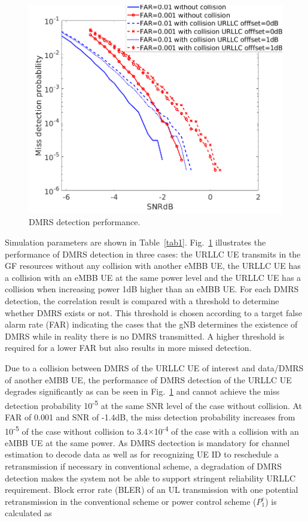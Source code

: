 \documentclass[conference]{IEEEtran}
\begin{document}
\begin{figure}[htbp]
\centerline{\includegraphics[scale=0.31]{fig5.png}}
\caption{DMRS detection performance.}
\label{fig5}
\vspace{-3mm}
\end{figure}

Simulation parameters are shown in Table~\ref{tab1}. Fig.~\ref{fig5} illustrates the performance of DMRS detection in three cases: the URLLC UE transmits in the GF resources without any collision with another eMBB UE, the URLLC UE has a collision with an eMBB UE at the same power level and the URLLC UE has a collision when increasing power 1dB higher than an eMBB UE. For each DMRS detection, the correlation result is compared with a threshold to determine whether DMRS exists or not. This threshold is chosen according to a target false alarm rate (FAR) indicating the cases that the gNB determines the existence of DMRS while in reality there is no DMRS transmitted. A higher threshold is required for a lower FAR but also results in more missed detection.

Due to a collision between DMRS of the URLLC UE of interest and data/DMRS of another eMBB UE, the performance of DMRS detection of the URLLC UE degrades significantly as can be seen in Fig.~\ref{fig5} and cannot achieve the miss detection probability 10\textsuperscript{-5} at the same SNR level of the case without collision. At FAR of 0.001 and SNR of -1.4dB, the miss detection probability increases from 10\textsuperscript{-5} of the case without collision to 3.4$\times$10\textsuperscript{-4} of the case with a collision with an eMBB UE at the same power. As DMRS dectection is mandatory for channel estimation to decode data as well as for recognizing UE ID to reschedule a retransmission if necessary in conventional scheme, a degradation of DMRS detection makes the system not be able to support stringent reliability URLLC requirement. Block error rate (BLER) of an UL transmission with one potential retransmission in the conventional scheme or power control scheme ($ P^{e}_{1}$) is calculated as\useshortskip
\end{document}

